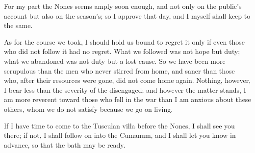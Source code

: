 

 For my part the Nones seems amply soon enough, and not only on the public's account but also on the season's; so I approve that day, and I myself shall keep to the same.

 As for the course we took, I should hold us bound to regret it only if even those who did not follow it had no regret. What we followed was not hope but duty; what we abandoned was not duty but a lost cause. So we have been more scrupulous than the men who never stirred from home, and saner than those who, after their resources were gone, did not come home again. Nothing, however, I bear less than the severity of the disengaged; and however the matter stands, I am more reverent toward those who fell in the war than I am anxious about these others, whom we do not satisfy because we go on living.

 If I have time to come to the Tusculan villa before the Nones, I shall see you there; if not, I shall follow on into the Cumanum, and I shall let you know in advance, so that the bath may be ready.
